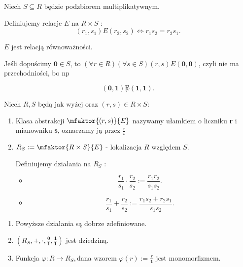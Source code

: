 Niech $S\subseteq R$ będzie podzbiorem multiplikatywnym.

Definiujemy relacje $E$ na $R\times S$ :
\[
	\left(r_1,s_1 \right) E \left( r_2,s_2 \right) \iff r_1s_2 = r_2s_1
.\] 
\begin{fact}
$E$ jest relacją równoważności.	
\end{fact}
\begin{remark}
	Jeśli dopuścimy $\mathbf{0}\in S$, to $\left(\forall r\in R \right)\left(\forall s\in S \right)\left( r,s \right) E\left( \mathbf{0},\mathbf{0} \right)$, czyli nie ma przechodniości, bo np

	\[
		\left( \mathbf{0},\mathbf{1} \right) \not E \left( \mathbf{1},\mathbf{1} \right)  
	.\] 
\end{remark} 

Niech $R,S $ będą jak wyżej oraz $\left( r,s \right) \in R\times S:$
\begin{enumerate}[label=\arabic*)]
	\item Klasa abstrakcji $\mfaktor{\left( r,s \right) }{E} $ nazywamy ułamkiem o liczniku \textbf{r} i mianowniku  \textbf{s}, oznaczamy ją przez $\frac{r}{s}$ 
	\item $R_{S}:= \mfaktor{R\times S}{E} $ - lokalizacja $R$ względem $S$.

		\noindent Definiujemy działania na $R_{S}$ :
		\begin{itemize}
			\item \[
			\frac{r_1}{s_1}\cdot \frac{r_2}{s_2}:= \frac{r_1r_2}{s_1s_2}
			.\] 
		\item \[
		\frac{r_1}{s_1} + \frac{r_2}{s_2} := \frac{r_1s_2 + r_2s_1}{s_1s_2}
		.\] 
		\end{itemize}
\end{enumerate}
\begin{theorem}
	\begin{enumerate}[label=\arabic*)]
		\item Powyższe działania są dobrze zdefiniowane.
		\item $\left( R_{S}, +, \cdot , \frac{\mathbf{0}}{\mathbf{1}}, \frac{\mathbf{1}}{\mathbf{1}} \right) $ jest dziedziną.
		\item Funkcja  $\varphi : R \to R_{S}, $dana wzorem $\varphi \left( r \right) := \frac{r}{\mathbf{1}} $ jest monomorfizmem.
	\end{enumerate}
\end{theorem} 


